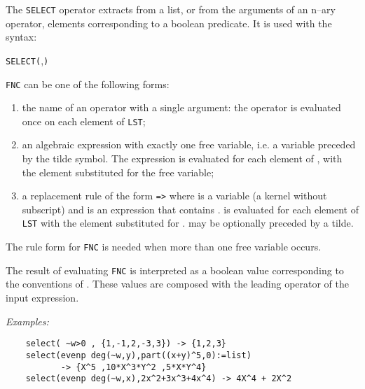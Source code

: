 The \texttt{SELECT} operator extracts from a list,
or from the arguments of an n--ary operator, elements corresponding
to a boolean predicate. It is used with the syntax:
\begin{syntax}
  \texttt{SELECT(},\texttt{)}
\end{syntax}

\texttt{FNC} can be one of the following forms:
\begin{enumerate}
\item the name of an operator with a single argument: the operator
is evaluated once on each element of \texttt{LST};
\item an algebraic expression with exactly one free variable, i.e.
a variable preceded by the tilde symbol. The expression
is evaluated for each element of , with the element
substituted for the free variable;
\item a replacement rule of the form  \texttt{=>} 
where  is a variable (a kernel without subscript)
and  is an expression that contains .
 is evaluated for each element of \texttt{LST} with
the element substituted for  .  may be
optionally preceded by a tilde.
\end{enumerate}
The rule form  for \texttt{FNC} is needed when more than
one free variable occurs.

The result of evaluating \texttt{FNC} is
interpreted as a boolean value corresponding to the conventions of
\REDUCE. These values are composed with the leading operator of the
input expression.

\textit{Examples:}\nopagebreak
\begin{verbatim}
    select( ~w>0 , {1,-1,2,-3,3}) -> {1,2,3}
    select(evenp deg(~w,y),part((x+y)^5,0):=list)
           -> {X^5 ,10*X^3*Y^2 ,5*X*Y^4}
    select(evenp deg(~w,x),2x^2+3x^3+4x^4) -> 4X^4 + 2X^2
\end{verbatim}



